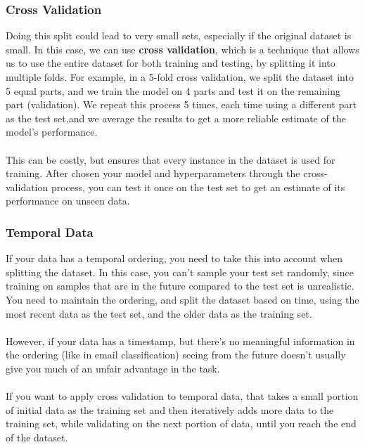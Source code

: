 \subsubsection{Cross Validation}
Doing this split could lead to very small sets, especially if the original dataset is small.
In this case, we can use \textbf{cross validation}, which is a technique that allows us to use the entire dataset for both training and testing, by splitting it into multiple folds.
For example, in a 5-fold cross validation, we split the dataset into 5 equal parts, and we train the model on 4 parts and test it on the remaining part (validation).
We repeat this process 5 times, each time using a different part as the test set,and we average the results to get a more reliable estimate of the model's performance.
\\\\
This can be costly, but ensures that every instance in the dataset is used for training.
After chosen your model and hyperparameters through the cross-validation process, you can test it once on the test set to get an estimate of its performance on unseen data.

\subsubsection{Temporal Data}
If your data has a temporal ordering, you need to take this into account when splitting the dataset.
In this case, you can't sample your test set randomly, since training on samples that are in the future compared to the test set is unrealistic.
You need to maintain the ordering, and split the dataset based on time, using the most recent data as the test set, and the older data as the training set.
\\\\
However, if your data has a timestamp, but there's no meaningful information in the ordering (like in email classification) seeing from the future doesn't usually give you much of an unfair advantage in the task.
\\\\
If you want to apply cross validation to temporal data, that takes a small portion of initial data as the training set and then iteratively adds more data to the training set, while validating on the next portion of data, until you reach the end of the dataset.